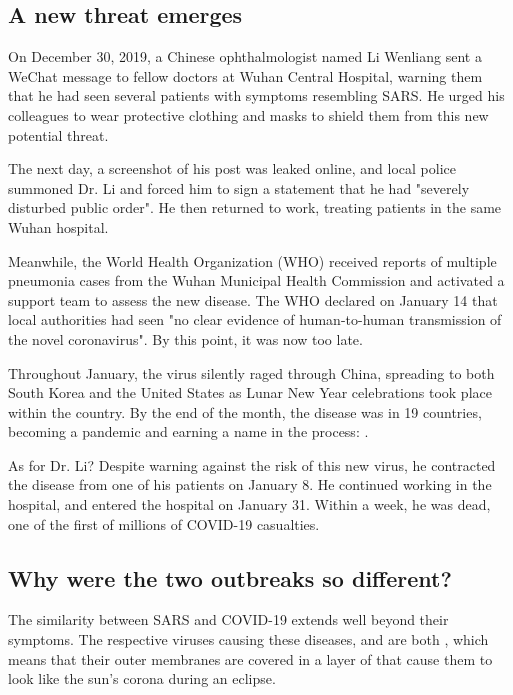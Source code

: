 \FloatBarrier
{}
\subsection{A new threat emerges}

On December 30, 2019, a Chinese ophthalmologist named Li Wenliang sent a WeChat message to fellow doctors at Wuhan Central Hospital, warning them that he had seen several patients with symptoms resembling SARS. He urged his colleagues to wear protective clothing and masks to shield them from this new potential threat.

The next day, a screenshot of his post was leaked online, and local police summoned Dr. Li and forced him to sign a statement that he had "severely disturbed public order". He then returned to work, treating patients in the same Wuhan hospital.

Meanwhile, the World Health Organization (WHO) received reports of multiple pneumonia cases from the Wuhan Municipal Health Commission and activated a support team to assess the new disease. The WHO declared on January 14 that local authorities had seen "no clear evidence of human-to-human transmission of the novel coronavirus". By this point, it was now too late.

Throughout January, the virus silently raged through China, spreading to both South Korea and the United States as Lunar New Year celebrations took place within the country. By the end of the month, the disease was in 19 countries, becoming a pandemic and earning a name in the process: .

As for Dr. Li? Despite warning against the risk of this new virus, he contracted the disease from one of his patients on January 8. He continued working in the hospital, and entered the hospital on January 31. Within a week, he was dead, one of the first of millions of COVID-19 casualties.

\FloatBarrier
{}
\subsection{Why were the two outbreaks so different?}

The similarity between SARS and COVID-19 extends well beyond their symptoms. The respective viruses causing these diseases,  and  are both , which means that their outer membranes are covered in a layer of  that cause them to look like the sun's corona during an eclipse.

